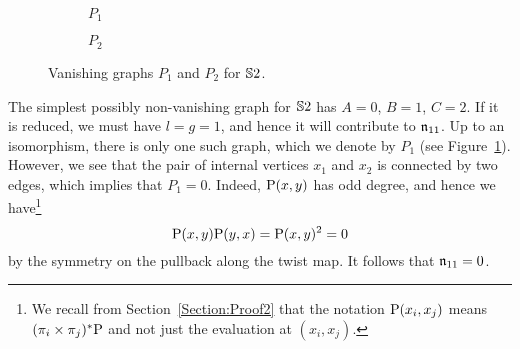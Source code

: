\documentclass[\MainFolder/Text.tex]{subfiles}
\begin{document}
\begin{Remark}\label{Rem:GraphsTwoSphere}

{ \begingroup
\begin{figure}
\centering
\begin{subfigure}{0.45\textwidth}
\centering

\caption{$P_1$}
\end{subfigure}
\begin{subfigure}{0.45\textwidth}
\centering

\caption{$P_2$}
\end{subfigure}
\caption{Vanishing graphs $P_1$ and $P_2$ for $\mathbb{S}{2}$.}\label{Fig:P1P2}
\end{figure}
\endgroup }
The simplest possibly non-vanishing graph for $\mathbb{S}{2}$ has $A= 0$, $B=1$, $C=2$. If it is reduced, we must have $l = g = 1$, and hence it will contribute to $\mathfrak{n}_{11}$. Up to an isomorphism, there is only one such graph, which we denote by $P_1$ (see Figure~\ref{Fig:P1P2}). However, we see that the pair of internal vertices $x_1$ and $x_2$ is connected by two edges, which implies that $P_1 =0$. Indeed, $\mathrm{P}(x,y)$ has odd degree, and hence we have\footnote{We recall from Section~\ref{Section:Proof2} that the notation $\mathrm{P}(x_i,x_j)$ means $(\pi_{i} \times \pi_j)^* \mathrm{P}$ and not just the evaluation at $(x_i,x_j)$.}
$$ \mathrm{P}(x,y)\mathrm{P}(y,x) = \mathrm{P}(x,y)^2 = 0 $$
by the symmetry on the pullback along the twist map. It follows that $\mathfrak{n}_{11} = 0$.


\end{Remark}
\end{document}
